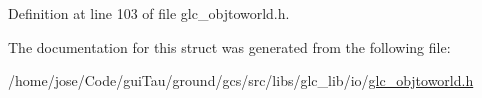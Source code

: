 Definition at line 103 of file glc\-\_\-objtoworld.\-h.



The documentation for this struct was generated from the following file\-:\begin{DoxyCompactItemize}
\item 
/home/jose/\-Code/gui\-Tau/ground/gcs/src/libs/glc\-\_\-lib/io/\hyperlink{glc__objtoworld_8h}{glc\-\_\-objtoworld.\-h}\end{DoxyCompactItemize}
